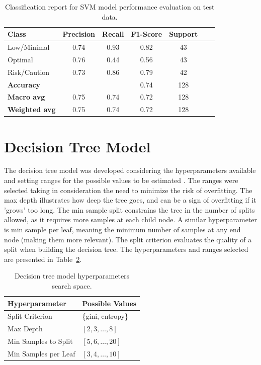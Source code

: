 \documentclass[conference]{IEEEtran}
\begin{document}
\begin{table}[H]
\centering
\caption{Classification report for SVM model performance evaluation on test data.}
\label{crTestSVM}
\begin{tabular}{lcccccc}
\toprule
\textbf{Class} & \textbf{Precision} & \textbf{Recall} & \textbf{F1-Score} & \textbf{Support} \\
\midrule
Low/Minimal & 0.74 & 0.93 & 0.82 & 43 \\
Optimal & 0.76 & 0.44 & 0.56 & 43 \\
Risk/Caution & 0.73 & 0.86 & 0.79 & 42 \\
\midrule
\textbf{Accuracy} &  &  & 0.74 & 128 \\
\textbf{Macro avg} & 0.75 & 0.74 & 0.72 & 128 \\
\textbf{Weighted avg} & 0.75 & 0.74 & 0.72 & 128 \\
\bottomrule
\end{tabular}
\end{table} %

\section{Decision Tree Model}

The decision tree model was developed considering the hyperparameters available and setting ranges for the possible values to be estimated \cite{dtree17}. The ranges were selected taking in consideration the need to minimize the risk of overfitting. The max depth illustrates how deep the tree goes, and can be a sign of overfitting if it 'grows' too long. The min sample split constrains the tree in the number of splits allowed, as it requires more samples at each child node. A similar hyperparameter is min sample per leaf, meaning the minimum number of samples at any end node (making them more relevant). The split criterion evaluates the quality of a split when building the decision tree. The hyperparameters and ranges selected are presented in Table~\ref{parametrosDTree}.

\begin{table}[H]
\centering
\caption{Decision tree model hyperparameters search space.}
\label{parametrosDTree}
\begin{tabular}{ll}
\toprule
\textbf{Hyperparameter} & \textbf{Possible Values} \\
\midrule
Split Criterion & \{gini, entropy\} \\ 
Max Depth & $[2, 3, \dots, 8]$ \\ 
Min Samples to Split & $[5, 6, \dots, 20]$ \\ 
Min Samples per Leaf & $[3, 4, \dots, 10]$ \\
\bottomrule
\end{tabular}
\end{table} %
\end{document}
